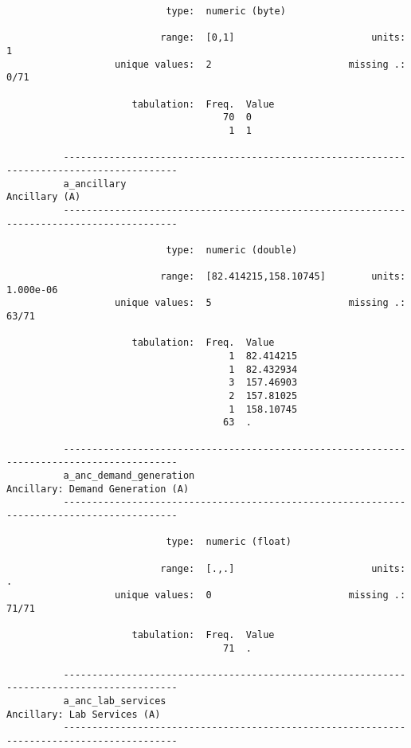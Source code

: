 \documentclass{article}
\begin{document}
\begin{verbatim}
                            type:  numeric (byte)
          
                           range:  [0,1]                        units:  1
                   unique values:  2                        missing .:  0/71
          
                      tabulation:  Freq.  Value
                                      70  0
                                       1  1
          
          ------------------------------------------------------------------------------------------
          a_ancillary                                                                  Ancillary (A)
          ------------------------------------------------------------------------------------------
          
                            type:  numeric (double)
          
                           range:  [82.414215,158.10745]        units:  1.000e-06
                   unique values:  5                        missing .:  63/71
          
                      tabulation:  Freq.  Value
                                       1  82.414215
                                       1  82.432934
                                       3  157.46903
                                       2  157.81025
                                       1  158.10745
                                      63  .
          
          ------------------------------------------------------------------------------------------
          a_anc_demand_generation                                   Ancillary: Demand Generation (A)
          ------------------------------------------------------------------------------------------
          
                            type:  numeric (float)
          
                           range:  [.,.]                        units:  .
                   unique values:  0                        missing .:  71/71
          
                      tabulation:  Freq.  Value
                                      71  .
          
          ------------------------------------------------------------------------------------------
          a_anc_lab_services                                             Ancillary: Lab Services (A)
          ------------------------------------------------------------------------------------------
          

\end{verbatim}
\end{document}
